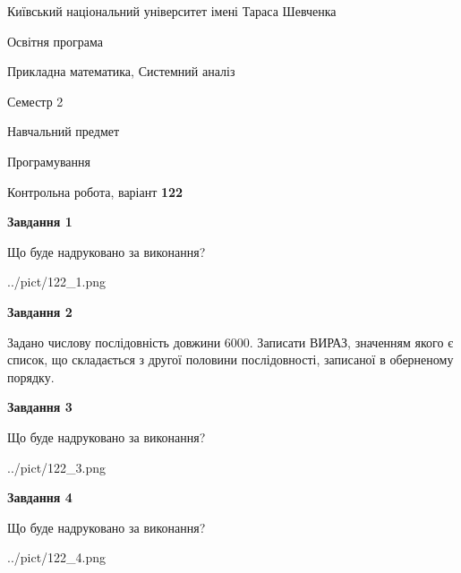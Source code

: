 \documentclass[12pt, ukrainian]{article}
\begin{document}
{{\begin {small}\par
{ \center  Київський національний університет імені Тараса Шевченка \par}
{\parbox {5 cm}{Освітня програма \hfill}{\parbox {8 cm}{Прикладна математика, Системний аналіз \hfill}}\parbox {5 cm}{\hfill Семестр 2}}\par
{\parbox {5 cm} {Навчальний предмет \hfill}\parbox {7 cm}{Програмування \hfill}\parbox {6cm}{\hfill}\par}\vspace{-7pt} \end{small}}{\center Контрольна робота, варіант  \No \textbf
{ 122 }\par}}
{
\begin {large}
{\begin {center}\textbf{Завдання 1}\end {center}}\par
Що буде надруковано за виконання?\par\par
\begin{center}
	{../pict/122_1.png}
\end{center}
\newpage

{\begin {center}\textbf{Завдання 2}\end {center}}\par

 Задано числову послідовність  довжини 6000. Записати ВИРАЗ, значенням якого є список, що складається з другої половини послідовності, записаної в оберненому порядку.\par
\newpage

{\begin {center}\textbf{Завдання 3}\end {center}}\par
Що буде надруковано за виконання?
\begin{center}
	{../pict/122_3.png}
\end{center}
\newpage

{\begin {center}\textbf{Завдання 4}\end {center}}\par
Що буде надруковано за виконання?\par
\begin{center}
	{../pict/122_4.png}
\end{center}
\newpage


\end{large}}
\end{document}
